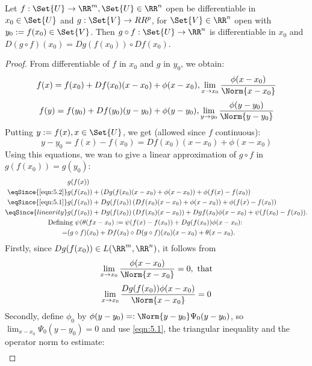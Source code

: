 \begin{thm}
  Let $f:\Set{U}\to\RR^m, \Set{U}\in\RR^n$ open be differentiable in $x_0\in \Set{U}$ and $g:\Set{V}\to RR^p$, for $\Set{V}\in \RR^n$ open with $y_0:=f(x_0)\in \Set{V}$. Then $g\circ f: \Set{U}\to \RR^n$ is differentiable in $x_0$ and $D(g\circ f)(x_0)=Dg(f(x_0))\circ Df(x_0)$.
\end{thm}
\begin{proof}
  From differentiable of $f$ in $x_0$ and $g$ in $y_0$, we obtain: 
  \begin{equation}
  	\label{eqn:5.1}
  	f(x)=f(x_0)+Df(x_0)(x-x_0)+\phi(x-x_0), \lim_{x\to x_0}\frac{\phi(x-x_0)}{\Norm{x-x_0}}
  \end{equation}
  \begin{equation}
  \label{eqn:5.2}
  f(y)=f(y_0)+Df(y_0)(y-y_0)+\phi(y-y_0), \lim_{y\to y_0}\frac{\phi(y-y_0)}{\Norm{y-y_0}}
  \end{equation}
  Putting $y:=f(x), x\in\Set{U}$, we get (allowed since $f$ continuous):
  \begin{equation}
  \label{eqn:5.3}
  y-y_0=f(x)-f(x_0)=Df(x_0)(x-x_0)+\phi(x-x_0)
  \end{equation}
  Using this equations, we wan to give a linear approximation of $g\circ f$ in $g(f(x_0))=g(y_0)$: 
  \begin{align*}
  	&g(f(x))\\
  	\eqSince{\eqref{eqn:5.2}}&g(f(x_0))+\left(Dg(f(x_0)(x-x_0)+\phi(x-x_0)\right)+\phi(f(x)-f(x_0))\\
  	\eqSince{\eqref{eqn:5.1}}&g(f(x_0))+Dg(f(x_0))\left(Df(x_0)(x-x_0)+\phi(x-x_0)\right)+\phi(f(x)-f(x_0))\\
  	\eqSince{linearity}&g(f(x_0))+Dg(f(x_0))\left(Df(x_0)(x-x_0)\right)+Dg f(x_0)\phi(x-x_0)+\psi(f(x_0)-f(x_0)). \\ &\text{\hspace{-1cm}Defining $\psi(\theta(fx-x_0):=\psi(f(x)-f(x_0))+Dg(f(x_0))\phi(x-x_0)$:}\\
  	=&(g\circ f)(x_0)+Df(x_0)\circ D(g\circ f)(x_0)(x-x_0)+\theta(x-x_0).
  \end{align*}
  Firstly, since $Dg(f(x_0))\in L(\RR^m,\RR^n)$, it follows from \[\lim_{x\to x_0}\frac{\phi(x-x_0)}{\Norm{x-x_0}}=0, \text{ that}\]
  \[\lim_{x\to x_0}\frac{Dg(f(x_0))\phi(x-x_0)}{\Norm{x-x_0}}=0\]
  Secondly, define $\phi_0$ by $\phi(y-y_0)=:\Norm{y-y_0}\Psi_0(y-y_0)$, so $\lim_{x-x_0}\Psi_0(y-y_0)=0$ and use \eqref{eqn:5.1}, the triangular inequality and the operator norm to estimate:
  \begin{align*}

\end{align*}
\end{proof}
